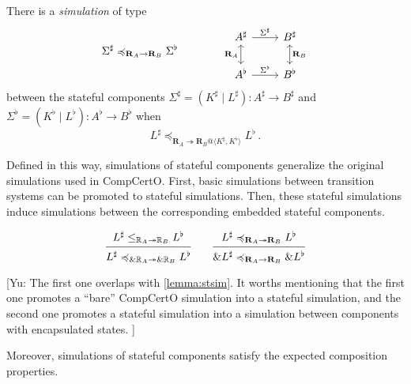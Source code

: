 \documentclass[acmsmall,screen,review,anonymous]{acmart}
\renewcommand{\preceq}{\preccurlyeq}
\begin{document}
\begin{definition}[Simulation] \label{def:ssim} %
There is a \emph{simulation} of type
\[
  \Sigma^\sharp \preceq_{\mathbf{R}_A \rightarrow \mathbf{R}_B} \Sigma^\flat
  \qquad \qquad
\begin{tikzcd}
  A^\sharp \ar[r, "\Sigma^\sharp"]
      \ar[d, leftrightarrow, "\mathbf{R}_A"'] &
  B^\sharp \ar[d, leftrightarrow, "\mathbf{R}_B"] \\
  A^\flat \ar[r, "\Sigma^\flat"] &
  B^\flat
\end{tikzcd}
\]
between
the stateful components
$\Sigma^\sharp = (K^\sharp \mid L^\sharp) : A^\sharp \rightarrow B^\sharp$ and
$\Sigma^\flat = (K^\flat \mid L^\flat) : A^\flat \rightarrow B^\flat$
when
\[
  L^\sharp
  \preceq_{\mathbf{R}_A \twoheadrightarrow
           \mathbf{R}_B@\langle K^\sharp, K^\flat \rangle}
  L^\flat
  \,.
\]
\end{definition}

Defined in this way,
simulations of stateful components generalize
the original simulations used in CompCertO.
First,
basic simulations between transition systems
can be promoted to stateful simulations.
Then,
these stateful simulations induce
simulations between the corresponding
embedded stateful components.

\begin{lemma} %
\[
  \begin{prooftree}
    \hypo{L^\sharp
      \le_{\mathbb{R}_A \twoheadrightarrow \mathbb{R}_B}
      L^\flat}
    \infer1{L^\sharp
      \preceq_{\&\mathbb{R}_A \twoheadrightarrow \&\mathbb{R}_B}
      L^\flat}
  \end{prooftree}
  \qquad
  \begin{prooftree}
    \hypo{L^\sharp
      \preceq_{\mathbf{R}_A \twoheadrightarrow \mathbf{R}_B}
      L^\flat}
    \infer1{\&L^\sharp
      \preceq_{\mathbf{R}_A \rightarrow \mathbf{R}_B}
      \&L^\flat}
  \end{prooftree}
\]
\end{lemma}
[Yu:
The first one overlaps with \ref{lemma:stsim}.
It worths mentioning that the first one promotes
a ``bare'' CompCertO simulation into a stateful simulation,
and the second one promotes
a stateful simulation into
a simulation between components with encapsulated states.
]

Moreover,
simulations of stateful components satisfy the expected
composition properties.
\end{document}

